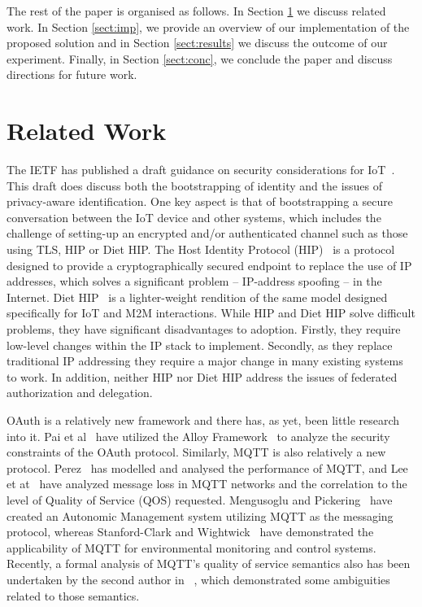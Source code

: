 \documentclass{llncs}
\begin{document}
The rest of the paper is organised as follows.  In Section \ref{sect:related} we discuss related work.  In Section \ref{sect:imp}, we provide an overview of our implementation of the proposed solution and in Section \ref{sect:results} we discuss the outcome of our experiment. Finally, in Section \ref{sect:conc}, we conclude the paper and discuss directions for future work.

\section{Related Work}\label{sect:related}
The IETF has published a draft guidance on security considerations for IoT~\cite{draft-garcia}. This draft
does discuss both the bootstrapping of identity and the issues of privacy-aware identification.
One key aspect is that of bootstrapping a secure conversation between the IoT device and other 
systems, which includes the challenge of setting-up an encrypted and/or authenticated channel
such as those using TLS, HIP or Diet HIP. The Host Identity Protocol (HIP)~\cite{moskowitz2012host} is a protocol designed 
to provide a cryptographically secured endpoint to replace the use of IP addresses, which solves
a significant problem -- IP-address spoofing -- in the Internet. Diet HIP~\cite{moskowitz2012hip} is a lighter-weight rendition
of the same model designed specifically for IoT and M2M interactions. While HIP and Diet HIP
solve difficult problems, they have significant disadvantages to adoption. Firstly, they require
low-level changes within the IP stack to implement. Secondly, as they replace traditional IP 
addressing they require a major change in many existing systems to work.
In addition, neither HIP nor Diet HIP address the issues of federated authorization and delegation.

OAuth is a relatively new framework and there has, as yet, been little research into it. 
Pai et al~\cite{pai2011formal}
have utilized the Alloy Framework~\cite{jackson2004alloy} 
to analyze the security constraints of the OAuth protocol. 
Similarly, MQTT is also relatively a new protocol. Perez~\cite{perez2005mqtt} has modelled and analysed the performance of MQTT, and Lee et at~\cite{lee2013correlation}
have analyzed message loss in MQTT networks and the correlation to the level of Quality of Service (QOS) requested.
Mengusoglu and Pickering~\cite{mengusoglu2007automated} have created 
an Autonomic Management system utilizing MQTT as the messaging protocol, whereas Stanford-Clark and Wightwick~\cite{stanford2010application} have demonstrated the applicability of MQTT for environmental monitoring and control systems. 
Recently, a formal analysis of MQTT's quality of service semantics also has been undertaken by the second author in ~\cite{aziz-mqtt}, which demonstrated some ambiguities related to those semantics.
\end{document}

